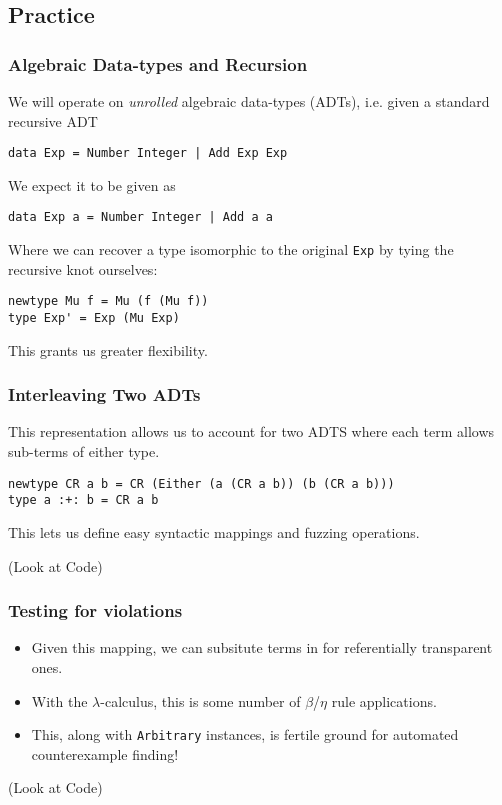 \documentclass{beamer}
\begin{document}
\subsection{Practice}

\begin{frame}[fragile]
  \frametitle{Algebraic Data-types and Recursion}
  We will operate on \emph{unrolled} algebraic data-types (ADTs), i.e. given a
  standard recursive ADT
\begin{verbatim}
data Exp = Number Integer | Add Exp Exp
\end{verbatim}
We expect it to be given as
\begin{verbatim}
data Exp a = Number Integer | Add a a
\end{verbatim}
Where we can recover a type isomorphic to the original \texttt{Exp} by tying the
recursive knot ourselves:
\begin{verbatim}
newtype Mu f = Mu (f (Mu f))
type Exp' = Exp (Mu Exp)
\end{verbatim}

This grants us greater flexibility.
\end{frame}

\begin{frame}[fragile]
  \frametitle{Interleaving Two ADTs}

  This representation allows us to account for two ADTS where each term allows
  sub-terms of either type.
\begin{verbatim}
newtype CR a b = CR (Either (a (CR a b)) (b (CR a b)))
type a :+: b = CR a b
\end{verbatim}

This lets us define easy syntactic mappings and fuzzing operations.

(Look at Code)

\end{frame}

\begin{frame}[fragile]
  \frametitle{Testing for violations}
  \begin{itemize}

  \item Given this mapping, we can subsitute terms in for referentially
    transparent ones.

  \item With the $\lambda$-calculus, this is some number of $\beta$/$\eta$ rule
    applications.
    
  \item This, along with \texttt{Arbitrary} instances, is fertile ground for
    automated counterexample finding!

  \end{itemize}
  
(Look at Code)

\end{frame}
\end{document}
